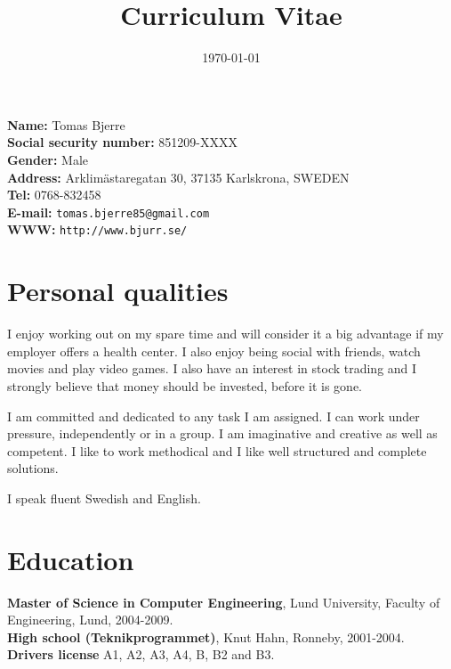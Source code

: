 \documentclass[a4paper]{article}
\title{\textbf{Curriculum Vitae}}
\date{\today}
\begin{document}
\maketitle
\thispagestyle{empty}

\textbf{Name:} Tomas Bjerre \\
\textbf{Social security number:} 851209-XXXX \\
\textbf{Gender:} Male \\
\textbf{Address:} Arklim\"astaregatan 30, 37135 Karlskrona, SWEDEN \\
\textbf{Tel:} 0768-832458 \\
\textbf{E-mail:} \texttt{tomas.bjerre85@gmail.com} \\
\textbf{WWW:} \texttt{http://www.bjurr.se/} \\

\section*{Personal qualities}
I enjoy working out on my spare time and will consider it a big advantage if my employer offers a health center. I also enjoy being social with friends, watch movies and play video games. I also have an interest in stock trading and I strongly believe that money should be invested, before it is gone.

I am committed and dedicated to any task I am assigned. I can work under pressure, independently or in a group. I am imaginative and creative as well as competent. I like to work methodical and I like well structured and complete solutions.

I speak fluent Swedish and English.

\section*{Education}
\textbf{Master of Science in Computer Engineering}, Lund University, Faculty of Engineering, Lund, 2004-2009. \\
\textbf{High school (Teknikprogrammet)}, Knut Hahn, Ronneby, 2001-2004. \\
\textbf{Drivers license} A1, A2, A3, A4, B, B2 and B3. \\
\newpage
\end{document}
